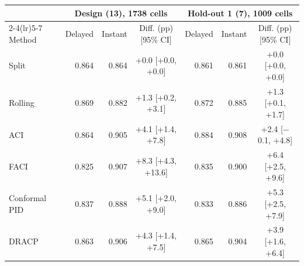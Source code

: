 \begin{tabular}{lrrcrrc}
\toprule
& \multicolumn{3}{c}{Design (13), 1738 cells} & \multicolumn{3}{c}{Hold-out 1 (7), 1009 cells} \\
\cmidrule(lr){2-4}\cmidrule(lr){5-7}
Method & Delayed & Instant & Diff. (pp) [95\% CI] & Delayed & Instant & Diff. (pp) [95\% CI] \\
\midrule
Split & 0.864 & 0.864 & +0.0 [+0.0, +0.0] & 0.861 & 0.861 & +0.0 [+0.0, +0.0] \\
Rolling & 0.869 & 0.882 & +1.3 [+0.2, +3.1] & 0.872 & 0.885 & +1.3 [+0.1, +1.7] \\
ACI & 0.864 & 0.905 & +4.1 [+1.4, +7.8] & 0.884 & 0.908 & +2.4 [$-$0.1, +4.8] \\
FACI & 0.825 & 0.907 & +8.3 [+4.3, +13.6] & 0.835 & 0.900 & +6.4 [+2.5, +9.6] \\
Conformal PID & 0.837 & 0.888 & +5.1 [+2.0, +9.0] & 0.833 & 0.886 & +5.3 [+2.5, +7.9] \\
DRACP & 0.863 & 0.906 & +4.3 [+1.4, +7.5] & 0.865 & 0.904 & +3.9 [+1.6, +6.4] \\
\bottomrule
\end{tabular}
